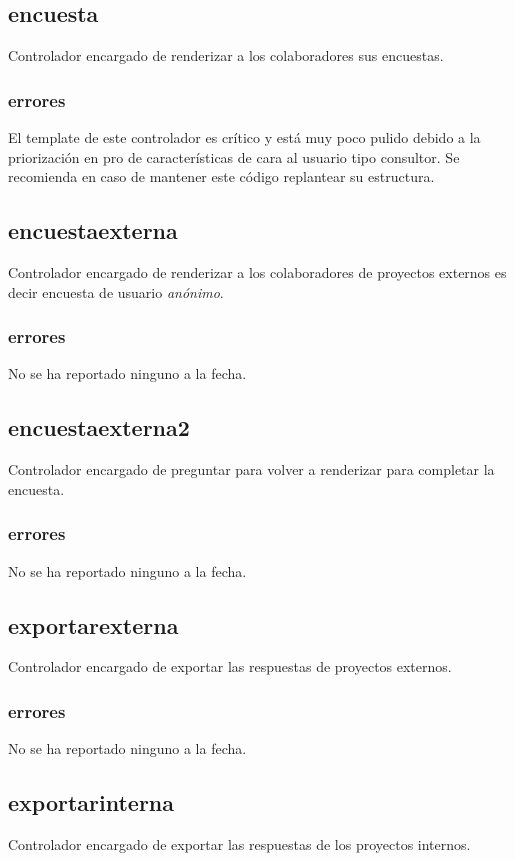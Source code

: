 \documentclass[10pt,a4paper]{book}
\begin{document}
	\subsection{encuesta}
	Controlador encargado de renderizar a los colaboradores sus encuestas.
	\subsubsection{errores}
	El template de este controlador es crítico y está muy poco pulido debido a la priorización en pro de características de cara al usuario tipo consultor. Se recomienda en caso de mantener este código replantear su estructura.

	\subsection{encuestaexterna}
	Controlador encargado de renderizar a los colaboradores de proyectos externos es decir encuesta de usuario \textit{anónimo}.
	\subsubsection{errores}
	No se ha reportado ninguno a la fecha.

	\subsection{encuestaexterna2}
	Controlador encargado de preguntar para volver a renderizar para completar la encuesta.
	\subsubsection{errores}
	No se ha reportado ninguno a la fecha.

	\subsection{exportarexterna}
	Controlador encargado de exportar las respuestas de proyectos externos.
	\subsubsection{errores}
	No se ha reportado ninguno a la fecha.

	\subsection{exportarinterna}
	Controlador encargado de exportar las respuestas de los proyectos internos.
\end{document}
